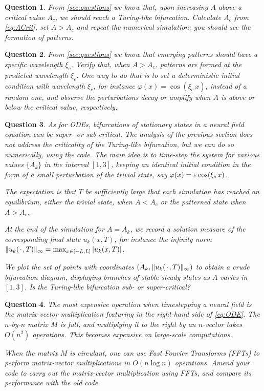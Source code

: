 \documentclass[a4paper]{siamonline220329}
\theoremstyle{plain}
\newtheorem{question}{Question}
\begin{document}
\begin{question} 
  From \cref{sec:questions} we know that, upon increasing $A$ above a critical value
  $A_c$, we should reach a Turing-like bifurcation. Calculate $A_c$ from
  \cref{eq:ACrit}, set $A > A_c$ and repeat the numerical simulation: you should see
  the formation of patterns.
\end{question}

\begin{question} 
  From \cref{sec:questions} we know that emerging patterns should have a specific wavelength
  $\xi_c$. Verify that, when $A > A_c$, patterns are formed at the predicted
  wavelength $\xi_c$. One way to do that is to set a deterministic initial condition with
  wavelength $\xi_c$, for instance $\varphi(x) =\cos(\xi_c\, x)$, instead of a random
  one, and observe the perturbations decay or amplify when $A$ is above or below the
  critical value, respectively.
\end{question}

\begin{question} 
  As for ODEs, bifurcations of stationary states in a neural field equation can be
  super- or sub-critical. The analysis of the previous section does not address the
  criticality of the Turing-like bifurcation, but we can do so numerically, using the
  code. The main idea is to time-step the system for various values $\{A_k\}$ in the
  interval $[1,3]$, keeping an identical initial condition in the form of a small
  perturbation of the trivial state, say $\varphi(x) = \varepsilon \cos(\xi_c \, x)$. 

  The expectation is that $T$ be sufficiently large that each simulation has reached
  an equilibrium, either the trivial state, when $A < A_c$ or the patterned state
  when $A > A_c$.

  At the end of the simulation for $A = A_k$, we record a solution measure of the
  corresponding final state $u_k(x,T)$, for instance the infinity norm  $\|
  u_k({\mkern 2mu\cdot\mkern 2mu},T) \|_{\infty} = \max_{x \in [-L,L]} | u_k(x,T) |$. 

  We plot the set of points with coordinates $(A_k, \| u_k({\mkern 2mu\cdot\mkern 2mu}, T) \|_{\infty})$
  to obtain a crude bifurcation diagram, displaying branches of stable steady states
  as $A$ varies in $[1,3]$. Is the Turing-like bifurcation sub- or super-critical?
\end{question}

\begin{question}
  The most expensive operation when timestepping a neural field is the matrix-vector
  multiplication featuring in the right-hand side of \cref{eq:ODE}. The $n$-by-$n$
  matrix $M$ is full, and multiplying it to the right by an $n$-vector takes $O(n^2)$
  operations. This becomes expensive on large-scale computations.

  When the matrix $M$ is circulant, one can use Fast Fourier Transforms (FFTs) to perform
  matrix-vector multiplications in $O(n \log n)$ operations. Amend your code to carry
  out the matrix-vector multiplication using FFTs, and compare its performance with
  the old code.
\end{question}


% 
% 
\end{document}
